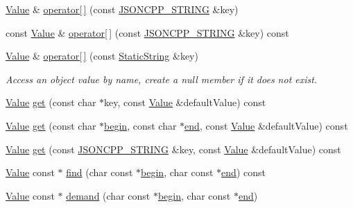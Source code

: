 \begin{DoxyCompactItemize}
\item 
\hyperlink{class_json_1_1_value}{Value} \& \hyperlink{class_json_1_1_value_aedd1e152756a4cc8c1ebac0dd7aeeb78}{operator\mbox{[}$\,$\mbox{]}} (const \hyperlink{json_8h_a1e723f95759de062585bc4a8fd3fa4be}{J\+S\+O\+N\+C\+P\+P\+\_\+\+S\+T\+R\+I\+NG} \&key)
\item 
const \hyperlink{class_json_1_1_value}{Value} \& \hyperlink{class_json_1_1_value_aba60f69dcd85e935aa85e7a517e03427}{operator\mbox{[}$\,$\mbox{]}} (const \hyperlink{json_8h_a1e723f95759de062585bc4a8fd3fa4be}{J\+S\+O\+N\+C\+P\+P\+\_\+\+S\+T\+R\+I\+NG} \&key) const
\item 
\hyperlink{class_json_1_1_value}{Value} \& \hyperlink{class_json_1_1_value_ac3763d7d315ca65dc188e273722f7955}{operator\mbox{[}$\,$\mbox{]}} (const \hyperlink{class_json_1_1_static_string}{Static\+String} \&key)
\begin{DoxyCompactList}\small\item\em Access an object value by name, create a null member if it does not exist. \end{DoxyCompactList}\item 
\hyperlink{class_json_1_1_value}{Value} \hyperlink{class_json_1_1_value_a57de86629ed23246f14014fb6c44fa67}{get} (const char $\ast$key, const \hyperlink{class_json_1_1_value}{Value} \&default\+Value) const
\item 
\hyperlink{class_json_1_1_value}{Value} \hyperlink{class_json_1_1_value_aa59ed050e87e1d58d93671a38687f36c}{get} (const char $\ast$\hyperlink{class_json_1_1_value_a015459a3950c198d63a2d3be8f5ae296}{begin}, const char $\ast$\hyperlink{class_json_1_1_value_a3e443cd0ef24f7e028b175e47ee045e0}{end}, const \hyperlink{class_json_1_1_value}{Value} \&default\+Value) const
\item 
\hyperlink{class_json_1_1_value}{Value} \hyperlink{class_json_1_1_value_a7406e6af727c288bf8ab59945ece686a}{get} (const \hyperlink{json_8h_a1e723f95759de062585bc4a8fd3fa4be}{J\+S\+O\+N\+C\+P\+P\+\_\+\+S\+T\+R\+I\+NG} \&key, const \hyperlink{class_json_1_1_value}{Value} \&default\+Value) const
\item 
\hyperlink{class_json_1_1_value}{Value} const  $\ast$ \hyperlink{class_json_1_1_value_afb007b9ce9b2cf9d5f667a07e5e0349f}{find} (char const $\ast$\hyperlink{class_json_1_1_value_a015459a3950c198d63a2d3be8f5ae296}{begin}, char const $\ast$\hyperlink{class_json_1_1_value_a3e443cd0ef24f7e028b175e47ee045e0}{end}) const
\item 
\hyperlink{class_json_1_1_value}{Value} const  $\ast$ \hyperlink{class_json_1_1_value_afeb7ff596a0929d90c5f2f3cffb413ed}{demand} (char const $\ast$\hyperlink{class_json_1_1_value_a015459a3950c198d63a2d3be8f5ae296}{begin}, char const $\ast$\hyperlink{class_json_1_1_value_a3e443cd0ef24f7e028b175e47ee045e0}{end})

\end{DoxyCompactItemize}

